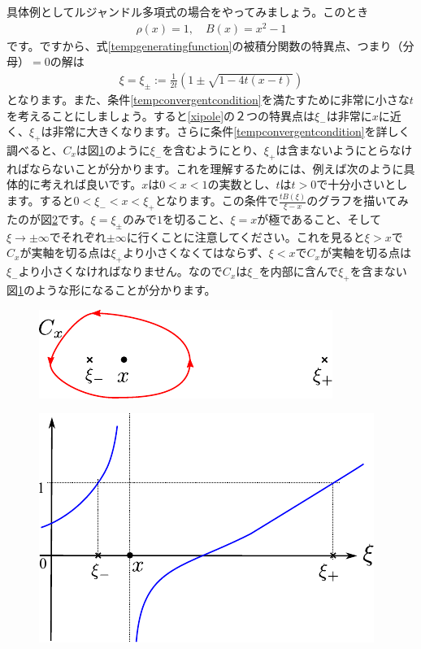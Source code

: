 \documentclass[report,paper=a4, fontsize=12pt, line_length=16cm, number_of_lines=33,dvipdfmx]{jlreq}
\numberwithin{equation}{section}
\begin{document}
具体例としてルジャンドル多項式の場合をやってみましょう。このとき
\begin{align}
  \rho(x)=1,\quad B(x)=x^2-1
\end{align}
です。ですから、式\eqref{tempgeneratingfunction}の被積分関数の特異点、つまり（分母）$=0$の解は
\begin{align}
  \xi=\xi_{\pm}:=\frac{1}{2t}(1\pm\sqrt{1-4t(x-t)})\label{xipole}
\end{align}
となります。また、条件\eqref{tempconvergentcondition}を満たすために非常に小さな$t$を考えることにしましょう。すると\eqref{xipole}の２つの特異点は$\xi_{-}$は非常に$x$に近く、$\xi_{+}$は非常に大きくなります。さらに条件\eqref{tempconvergentcondition}を詳しく調べると、$C_x$は図\ref{fig:genfunc}のように$\xi_{-}$を含むようにとり、$\xi_{+}$は含まないようにとらなければならないことが分かります。これを理解するためには、例えば次のように具体的に考えれば良いです。$x$は$0<x<1$の実数とし、$t$は$t>0$で十分小さいとします。すると$0<\xi_{-}<x<\xi_{+}$となります。この条件で$\frac{tB(\xi)}{\xi-x}$のグラフを描いてみたのが図\ref{fig:genfunc2}です。$\xi=\xi_{\pm}$のみで$1$を切ること、$\xi=x$が極であること、そして$\xi\to \pm \infty$でそれぞれ$\pm \infty$に行くことに注意してください。これを見ると$\xi>x$で$C_x$が実軸を切る点は$\xi_{+}$より小さくなくてはならず、$\xi<x$で$C_x$が実軸を切る点は$\xi_{-}$より小さくなければなりません。なので$C_{x}$は$\xi_{-}$を内部に含んで$\xi_{+}$を含まない図\ref{fig:genfunc}のような形になることが分かります。
\begin{figure}[htbp]
  \centering
  \includegraphics{genfunc.pdf}
  \caption{}
  \label{fig:genfunc}
\end{figure}
\begin{figure}[htbp]
  \centering
  \includegraphics{genfunc2.pdf}
  \caption{}
  \label{fig:genfunc2}
\end{figure}
\end{document}
